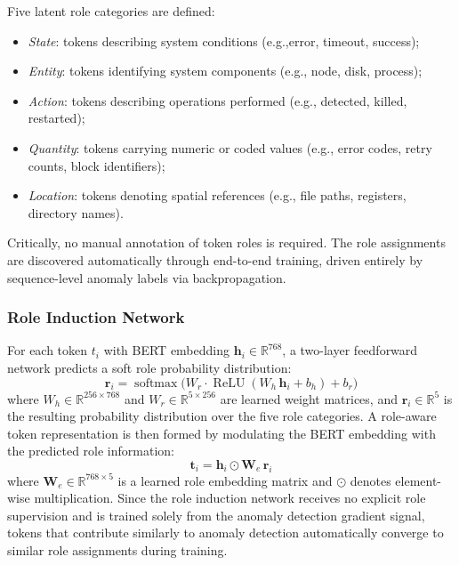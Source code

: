 Five latent role categories are defined:
\begin{itemize}
    \item \textit{State}: tokens describing system conditions (e.g.,error, timeout, success);
    \item \textit{Entity}: tokens identifying system components (e.g., node, disk, process);
    \item \textit{Action}: tokens describing operations performed  (e.g., detected, killed, restarted);
    \item \textit{Quantity}: tokens carrying numeric or coded values (e.g., error codes, retry counts, block identifiers);
    \item \textit{Location}: tokens denoting spatial references (e.g., file paths, registers, directory names).
\end{itemize}

Critically, no manual annotation of token roles is required. The role assignments are discovered automatically through end-to-end training, driven entirely by sequence-level anomaly labels via backpropagation.

\subsubsection{Role Induction Network}

For each token $t_i$ with BERT embedding $\mathbf{h}_i \in \mathbb{R}^{768}$, a two-layer feedforward network predicts a soft role probability distribution:
\begin{equation}
\mathbf{r}_i = \operatorname{softmax}\!\bigl(W_r \cdot \operatorname{ReLU}(W_h\, \mathbf{h}_i + b_h) + b_r\bigr)
\end{equation}
where $W_h \in \mathbb{R}^{256 \times 768}$ and $W_r \in \mathbb{R}^{5 \times 256}$ are learned weight matrices, and $\mathbf{r}_i \in \mathbb{R}^5$ is the resulting probability distribution over the five role categories. A role-aware token representation is then formed by modulating the BERT embedding with the predicted role information:
\begin{equation}
\mathbf{t}_i = \mathbf{h}_i \odot \mathbf{W}_e\, \mathbf{r}_i
\end{equation}
where $\mathbf{W}_e \in \mathbb{R}^{768 \times 5}$ is a learned role embedding matrix and $\odot$ denotes element-wise multiplication. Since the role induction network receives no explicit role supervision and is trained solely from the anomaly detection gradient signal, tokens that contribute similarly to anomaly detection automatically converge to similar role assignments during training.

